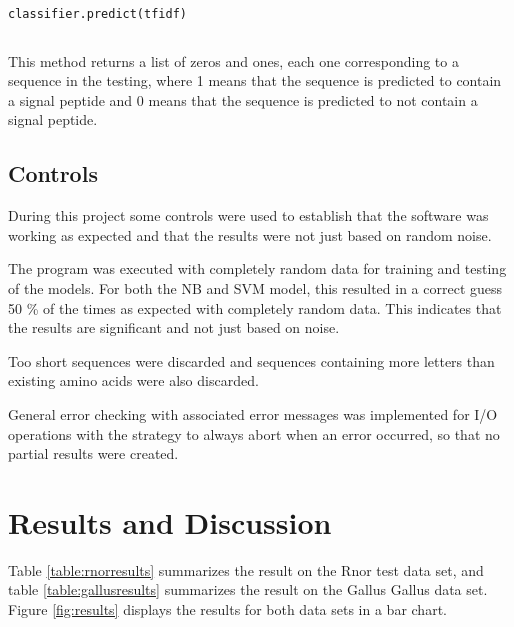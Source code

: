 \documentclass[10pt]{article}
\begin{document}
\begin{lstlisting}
classifier.predict(tfidf)
\end{lstlisting}
\begin{equation}
\label{eq:predict}
\end{equation}

This method returns a list of zeros and ones, each one corresponding to a sequence in the testing, where 1 means that the sequence is predicted to contain a signal peptide and 0 means that the sequence is predicted to not contain a signal peptide.

\subsection{Controls}
During this project some controls were used to establish that the software was working as expected and that the results were not just based on random noise.

The program was executed with completely random data for training and testing of the models. For both the NB and SVM model, this resulted in a correct guess 50 \% of the times as expected with completely random data. This indicates that the results are significant and not just based on noise.

Too short sequences were discarded and sequences containing more letters than existing amino acids were also discarded.

General error checking with associated error messages was implemented for I/O operations with the strategy to always abort when an error occurred, so that no partial results were created.

\section{Results and Discussion}
Table \ref{table:rnorresults} summarizes the result on the Rnor test data set, and
table \ref{table:gallusresults} summarizes the result on the Gallus Gallus data set.
Figure \ref{fig:results} displays the results for both data sets in a bar chart.
\end{document}
